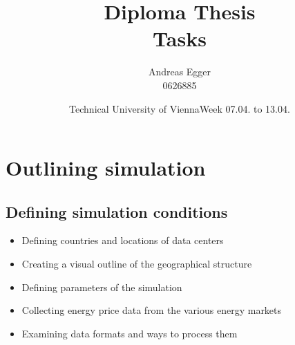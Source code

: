\documentclass[a4paper]{article}
\title{Diploma Thesis\\Tasks}
\author{Andreas Egger \\0626885}
\date{Technical University of Vienna}
\begin{document}
\maketitle

\newpage

\tableofcontents

\newpage

\section{Outlining simulation}
\hfill\date{Week 07.04. to 13.04.}

\subsection{Defining simulation conditions}

\begin{itemize}

\item Defining countries and locations of data centers

\item Creating a visual outline of the geographical structure

\item Defining parameters of the simulation

\item Collecting energy price data from the various energy markets

\item Examining data formats and ways to process them


\end{itemize}
\end{document}
